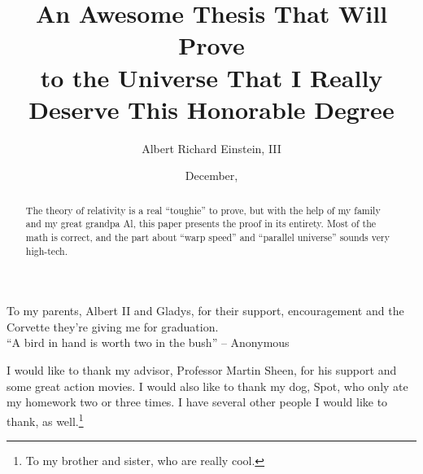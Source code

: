 \documentclass[botnum, fleqn]{unmeethesis}
\begin{document}
\frontmatter




\title{An Awesome Thesis That Will Prove \\ to the Universe
       That I Really Deserve This Honorable Degree}

\author{Albert Richard Einstein, III}





\date{December, \thisyear}

\maketitle


\begin{dedication}
   To my parents, Albert II and Gladys, for their support,
   encouragement and the Corvette they're giving me for graduation. \\[3ex]
   ``A bird in hand is worth two in the bush''
         -- Anonymous
\end{dedication}

\begin{acknowledgments}
   \vspace{1.1in}
   I would like to thank my advisor, Professor Martin Sheen, for his support
   and some great action movies.  I would also like to thank my dog, Spot,
   who only ate my homework two or three times.  I have several other people
   I would like to thank, as well.\footnote{To my brother and sister, who
   are really cool.}
\end{acknowledgments}

\maketitleabstract %

\begin{abstract}
   The theory of relativity is a real ``toughie'' to prove, but with the
   help of my family and my great grandpa Al, this paper presents the
   proof in its entirety.  Most of the math is correct, and the
   part about ``warp speed'' and ``parallel universe'' sounds very high-tech.
\clearpage %
\end{abstract}
\end{document}
